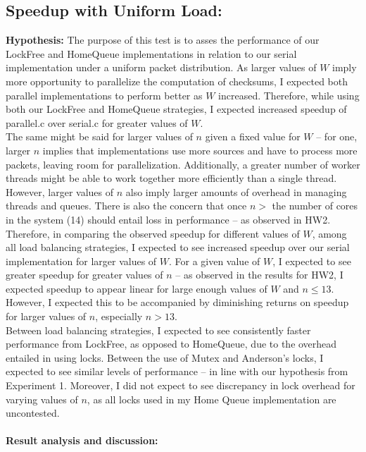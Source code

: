 \documentclass[]{article}
\begin{document}
\subsection{Speedup with Uniform Load:}
\textbf{Hypothesis:}
The purpose of this test is to asses the performance of our LockFree and HomeQueue implementations in relation to our serial implementation under a uniform packet distribution. As larger values of $W$ imply more opportunity to parallelize the computation of checksums, I expected both parallel implementations to perform better as $W$ increased. Therefore, while using both our LockFree and HomeQueue strategies,  I  expected increased speedup of parallel.c over serial.c for greater values of $W$. 
\\
The same might be said for larger values of $n$ given a fixed value for $W$ -- for one, larger $n$ implies that implementations use more sources and have to process more packets, leaving room for parallelization. Additionally, a greater number of worker threads might be able to work together more efficiently than a single thread. However, larger values of $n$ also imply larger amounts of overhead in managing threads and queues. There is also the concern that once $n >$ the number of cores in the system (14) should entail loss in performance -- as observed in HW2.
\\
Therefore, in comparing the observed speedup for different values of $W$, among all load balancing strategies, I expected to see increased speedup over our serial implementation for larger values of $W$. For a given value of $W$, I expected to see greater speedup for greater values of $n$ -- as observed in the results for HW2, I expected speedup to appear linear for large enough values of $W$ and $n \leq 13$. However, I expected this to be accompanied by diminishing returns on speedup for larger values of $n$, especially $n > 13$.
\\
Between load balancing strategies, I expected to see consistently faster performance from LockFree, as opposed to HomeQueue, due to the overhead entailed in using locks. Between the use of Mutex and Anderson's locks, I expected to see similar levels of performance -- in line with our hypothesis from Experiment 1. Moreover, I did not expect to see discrepancy in lock overhead for varying values of $n$, as all locks used in my Home Queue implementation are uncontested.%
\\\\
\textbf{Result analysis and discussion:}
\end{document}
